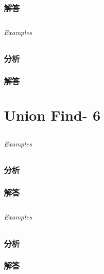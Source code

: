 \documentclass[UTF8,a4paper,12pt]{ctexbook}
\begin{document}
	\subsection{解答}
	
\section{}
	
	\subparagraph{Examples}
	
	\subsection{分析}
	
	\subsection{解答}
\chapter{Union Find- 6}	
\section{}
	
	\subparagraph{Examples}
	
	\subsection{分析}
	
	\subsection{解答}
	
\section{}
	
	\subparagraph{Examples}
	
	\subsection{分析}
	
	\subsection{解答}
	
	
\section{}
	
\end{document}
